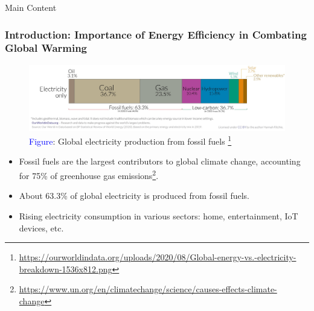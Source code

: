 \documentclass{beamer}
\begin{document}
\begin{frame}{Main Content}
\frametitle{Introduction: Importance of Energy Efficiency in Combating Global Warming}

\begin{figure}
    \vspace*{-0.8cm} %
    \centering
    \includegraphics[width=1\textwidth]{figures/Global_electricity_from_fossil_fuels.jpg}
    \captionsetup{justification=centering, skip=0pt} %
    \caption*{\scriptsize{\textcolor{blue}{Figure}: Global electricity production from fossil fuels \footnote{\tiny \url{https://ourworldindata.org/uploads/2020/08/Global-energy-vs.-electricity-breakdown-1536x812.png}}}}
    \label{fig:Global_electricity_from_fossil_fuels}
    
\end{figure}

 
\begin{itemize}
    \vspace*{-0.5cm} %
    \item \footnotesize Fossil fuels are the largest contributors to global climate change, accounting for 75\% of greenhouse gas emissions\footnote{\tiny \url{https://www.un.org/en/climatechange/science/causes-effects-climate-change}}.
    \item \footnotesize About 63.3\% of global electricity is produced from fossil fuels.
    \item \footnotesize Rising electricity consumption in various sectors: home, entertainment, IoT devices, etc.
\end{itemize}
\vspace*{-0.4cm}
\end{frame}
\end{document}
